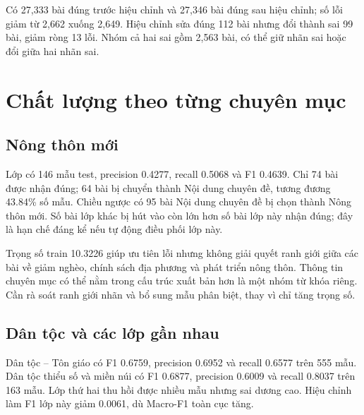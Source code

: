 Có 27,333 bài đúng trước hiệu chỉnh và 27,346 bài đúng sau hiệu chỉnh; số lỗi giảm từ 2,662 xuống 2,649. Hiệu chỉnh sửa đúng 112 bài nhưng đổi thành sai 99 bài, giảm ròng 13 lỗi. Nhóm cả hai sai gồm 2,563 bài, có thể giữ nhãn sai hoặc đổi giữa hai nhãn sai.

\section{Chất lượng theo từng chuyên mục}

\subsection{Nông thôn mới}
Lớp có 146 mẫu test, precision 0.4277, recall 0.5068 và F1 0.4639. Chỉ 74 bài được nhận đúng; 64 bài bị chuyển thành Nội dung chuyên đề, tương đương 43.84\% số mẫu. Chiều ngược có 95 bài Nội dung chuyên đề bị chọn thành Nông thôn mới. Số bài lớp khác bị hút vào còn lớn hơn số bài lớp này nhận đúng; đây là hạn chế đáng kể nếu tự động điều phối lớp này.

Trọng số train 10.3226 giúp ưu tiên lỗi nhưng không giải quyết ranh giới giữa các bài về giảm nghèo, chính sách địa phương và phát triển nông thôn. Thông tin chuyên mục có thể nằm trong cấu trúc xuất bản hơn là một nhóm từ khóa riêng. Cần rà soát ranh giới nhãn và bổ sung mẫu phân biệt, thay vì chỉ tăng trọng số.

\subsection{Dân tộc và các lớp gần nhau}
Dân tộc -- Tôn giáo có F1 0.6759, precision 0.6952 và recall 0.6577 trên 555 mẫu. Dân tộc thiểu số và miền núi có F1 0.6877, precision 0.6009 và recall 0.8037 trên 163 mẫu. Lớp thứ hai thu hồi được nhiều mẫu nhưng sai dương cao. Hiệu chỉnh làm F1 lớp này giảm 0.0061, dù Macro-F1 toàn cục tăng.

